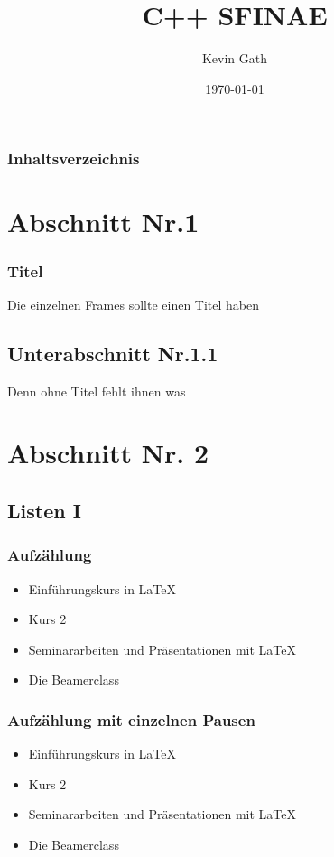 \documentclass[hyperref={pdfpagelabels=false}]{beamer}
\title{C++ SFINAE}
\author{Kevin Gath}
\date{\today}
\begin{document}
\begin{frame}
\titlepage
\end{frame} 

\begin{frame}
\frametitle{Inhaltsverzeichnis}
\tableofcontents
\end{frame} 


\section{Abschnitt Nr.1} 
\begin{frame}
\frametitle{Titel} 
Die einzelnen Frames sollte einen Titel haben 
\end{frame}
\subsection{Unterabschnitt Nr.1.1  }
\begin{frame} 
Denn ohne Titel fehlt ihnen was
\end{frame}


\section{Abschnitt Nr. 2} 
\subsection{Listen I}
\begin{frame}
\frametitle{Aufz\"ahlung}
\begin{itemize}
\item Einf\"uhrungskurs in \LaTeX{}  
\item Kurs 2  
\item Seminararbeiten und Pr\"asentationen mit \LaTeX{} 
\item Die Beamerclass 
\end{itemize} 
\end{frame}

\begin{frame}
\frametitle{Aufz\"ahlung mit einzelnen Pausen}
\begin{itemize}
\item  Einf\"uhrungskurs in \LaTeX{} \pause 
\item  Kurs 2 \pause 
\item  Seminararbeiten und Pr\"asentationen mit \LaTeX{} \pause 
\item  Die Beamerclass
\end{itemize} 
\end{frame}
\end{document}

